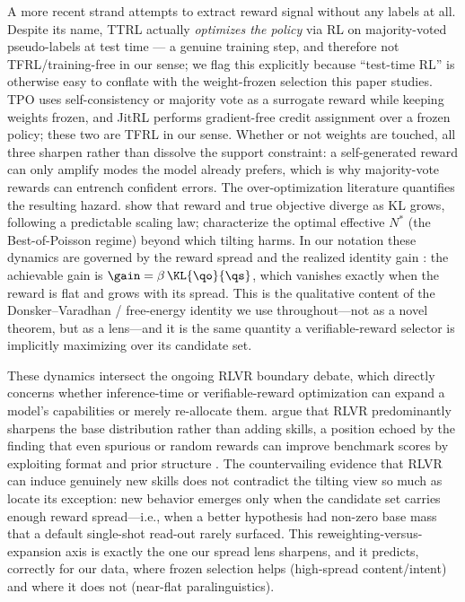 A more recent strand attempts to extract reward signal without any labels at all. Despite its name, TTRL \citep{zuo2025ttrl} actually \emph{optimizes the policy} via RL on majority-voted pseudo-labels at test time --- a genuine training step, and therefore not TFRL/training-free in our sense; we flag this explicitly because ``test-time RL'' is otherwise easy to conflate with the weight-frozen selection this paper studies. TPO \citep{li2025tpo} uses self-consistency or majority vote as a surrogate reward while keeping weights frozen, and JitRL \citep{jitrl2026} performs gradient-free credit assignment over a frozen policy; these two are TFRL in our sense. Whether or not weights are touched, all three sharpen rather than dissolve the support constraint: a self-generated reward can only amplify modes the model already prefers, which is why majority-vote rewards can entrench confident errors. The over-optimization literature quantifies the resulting hazard. \citet{gao2023overopt} show that reward and true objective diverge as KL grows, following a predictable scaling law; \citet{khalaf2025hedgetune} characterize the optimal effective $N^\ast$ (the Best-of-Poisson regime) beyond which tilting harms. In our notation these dynamics are governed by the reward spread \spread and the realized identity gain \gain: the achievable gain is \(\gain=\beta\,\KL{\qo}{\qs}\), which vanishes exactly when the reward is flat and grows with its spread. This is the qualitative content of the Donsker--Varadhan / free-energy identity we use throughout---not as a novel theorem, but as a lens---and it is the same quantity a verifiable-reward selector is implicitly maximizing over its candidate set.

These dynamics intersect the ongoing RLVR boundary debate, which directly concerns whether inference-time or verifiable-reward optimization can expand a model's capabilities or merely re-allocate them. \citet{rlvrincentive2025} argue that RLVR predominantly sharpens the base distribution rather than adding skills, a position echoed by the finding that even spurious or random rewards can improve benchmark scores by exploiting format and prior structure \citep{spuriousrewards2025}. The countervailing evidence that RLVR can induce genuinely new skills \citep{newskills2026} does not contradict the tilting view so much as locate its exception: new behavior emerges only when the candidate set \cZ carries enough reward spread---i.e., when a better hypothesis had non-zero base mass that a default single-shot read-out rarely surfaced. This reweighting-versus-expansion axis is exactly the one our spread lens sharpens, and it predicts, correctly for our data, where frozen selection helps (high-spread content/intent) and where it does not (near-flat paralinguistics).

